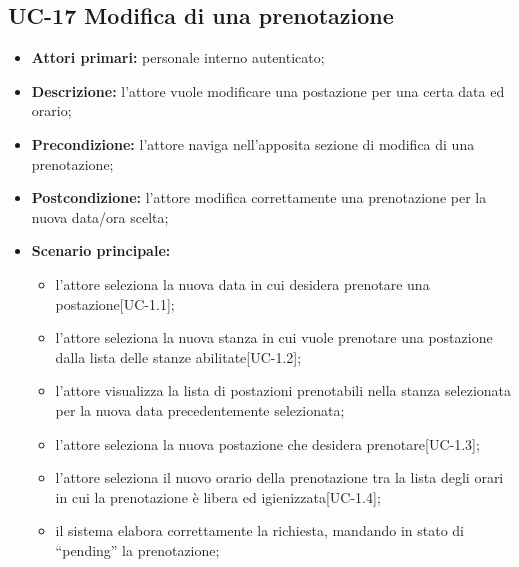 

\subsection{UC-17 Modifica di una prenotazione}

\begin{itemize}
\item \textbf{Attori primari:} personale interno autenticato;
\item \textbf{Descrizione:} l'attore vuole modificare una postazione per una certa data ed orario;
\item \textbf{Precondizione:} l'attore naviga nell’apposita sezione di modifica di una prenotazione;
\item \textbf{Postcondizione:} l'attore modifica correttamente una prenotazione per la nuova data/ora scelta;
\item \textbf{Scenario principale:} 
	\begin{itemize}
		\item l'attore seleziona la nuova data in cui desidera prenotare una postazione[UC-1.1];
		\item l'attore seleziona la nuova stanza in cui vuole prenotare una postazione dalla lista delle stanze abilitate[UC-1.2];
		\item l'attore visualizza la lista di postazioni prenotabili nella stanza selezionata per la nuova data precedentemente selezionata;
		\item l'attore seleziona la nuova postazione che desidera prenotare[UC-1.3];
		\item l'attore seleziona il nuovo orario della prenotazione tra la lista degli orari in cui la prenotazione è libera ed igienizzata[UC-1.4];
		\item il sistema elabora correttamente la richiesta, mandando in stato di “pending” la prenotazione;
	\end{itemize}
\end{itemize}

